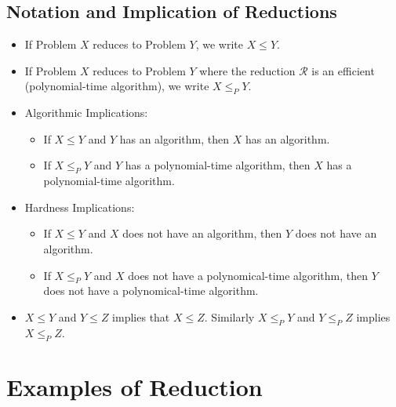\documentclass[12pt]{article}
\begin{document}
\subsection{Notation and Implication of Reductions}
\begin{itemize}
    \item If Problem $X$ reduces to Problem $Y$, we write $X \leq Y$.
    \item If Problem $X$ reduces to Problem $Y$ where the reduction $\mathcal{R}$ is an efficient (polynomial-time algorithm), we write $X \leq_P Y$.
    \item Algorithmic Implications:
    \begin{itemize}
        \item If $X \leq Y$ and $Y$ has an algorithm, then $X$ has an algorithm.
        \item If $X \leq_P Y$ and $Y$ has a polynomial-time algorithm, then $X$ has a polynomial-time algorithm.
    \end{itemize}
    \item Hardness Implications:
    \begin{itemize}
        \item If $X \leq Y$ and $X$ does not have an algorithm, then $Y$ does not have an algorithm.
        \item If $X \leq_P Y$ and $X$ does not have a polynomical-time algorithm, then $Y$ does not have a polynomical-time algorithm.
    \end{itemize}
    \item $X \leq Y$ and $Y \leq Z$ implies that $X \leq Z$. Similarly $X \leq_P Y$ and $Y \leq_P Z$ implies $X \leq_P Z$.
\end{itemize}

\section{Examples of Reduction}
\end{document}
